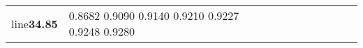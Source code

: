 \documentclass[runningheads]{llncs}
\begin{document}
\begin{table}[!ht]
\begin{tabular}{|p{7em}|p{2.5em}|p{2.5em}|p{3em}|p{2.5em}|p{3em}|p{2.5em}|p{3em}|p{2.5em}|p{3em}|p{2.5em}|p{3em}|}
line{}\bfseries{34.85} & 0.8682 \newline{}0.9090 \newline{}0.9140 \newline{}0.9210 \newline{}0.9227 \newline{}0.9248 \newline{}0.9280 \newline
\end{tabular}
\end{table}
\end{document}
